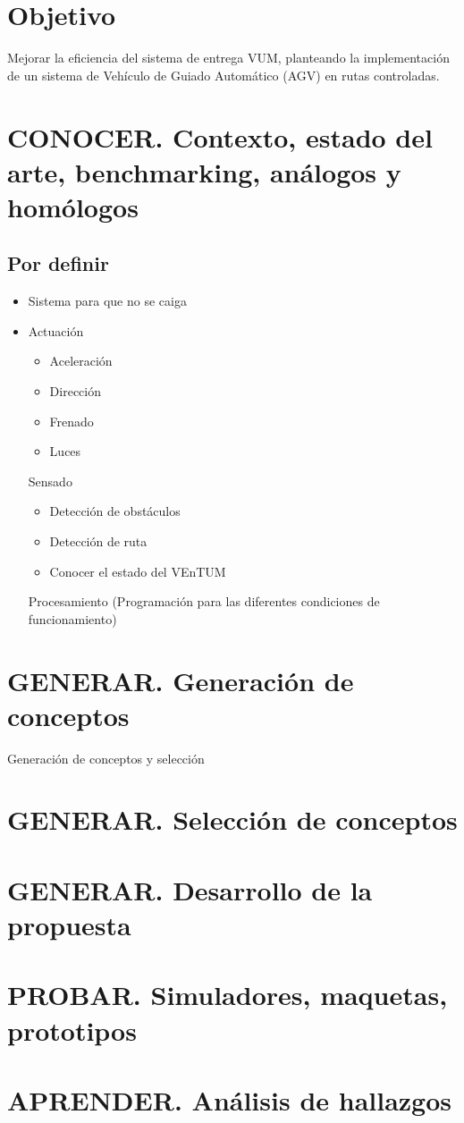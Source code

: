 \section{Objetivo}

Mejorar la eficiencia del sistema de entrega VUM, planteando la implementación de un sistema de Vehículo de Guiado Automático (AGV) en rutas controladas.\cite{yo}

\section{CONOCER. Contexto, estado del arte, benchmarking, análogos y homólogos}

\subsection{Por definir}
\begin{itemize}
\item Sistema para que no se caiga
\item Actuación

\begin{itemize}
\item Aceleración
\item Dirección
\item Frenado
\item Luces
\end{itemize}

Sensado
\begin{itemize}
\item Detección de obstáculos
\item Detección de ruta
\item Conocer el estado del VEnTUM
\end{itemize}

Procesamiento (Programación para las diferentes condiciones de funcionamiento)

\end{itemize}




\section{GENERAR. Generación de conceptos}
Generación de conceptos y selección
\section{GENERAR. Selección de conceptos}
\section{GENERAR. Desarrollo de la propuesta}
\section{PROBAR. Simuladores, maquetas, prototipos}

\section{APRENDER. Análisis de hallazgos}
